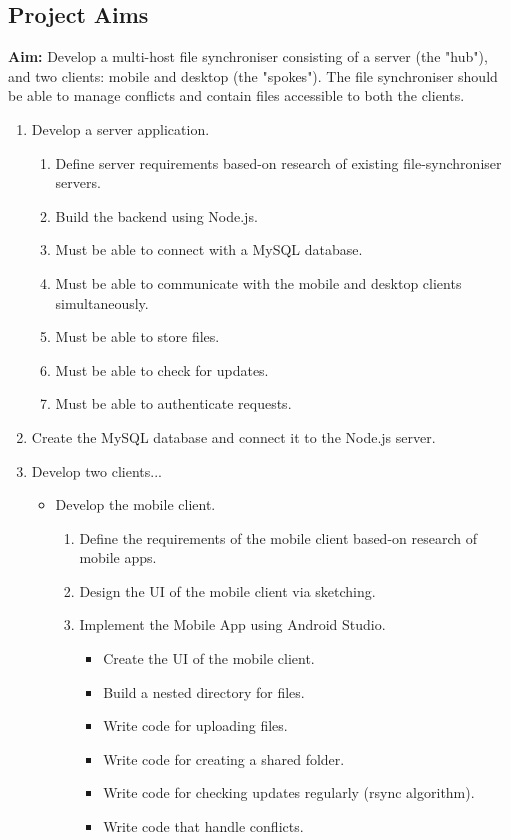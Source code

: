 \documentclass{article}
\begin{document}
	\subsection{Project Aims}
	\textbf{Aim: } Develop a multi-host file synchroniser consisting of a server (the "hub"), and two clients: mobile and desktop (the "spokes"). The file synchroniser should be able to manage conflicts and contain files accessible to both the clients.
	\begin{enumerate}
	\item Develop a server application.
		\begin{enumerate}
		\item Define server requirements based-on research of existing file-synchroniser servers.
		\item Build the backend using Node.js.
		\item Must be able to connect with a MySQL database.
		\item Must be able to communicate with the mobile and desktop clients simultaneously.
		\item Must be able to store files.
		\item Must be able to check for updates.
		\item Must be able to authenticate requests. 
		\end{enumerate}
	\item Create the MySQL database and connect it to the Node.js server.
	\item Develop two clients...
		\begin{itemize}
		\item Develop the mobile client.
			\begin{enumerate}
			\item Define the requirements of the mobile client based-on research of mobile apps.
			\item Design the UI of the mobile client via sketching.
			\item Implement the Mobile App using Android Studio.
				\begin{itemize}
				\item Create the UI of the mobile client.
				\item Build a nested directory for files.
				\item Write code for uploading files.
				\item Write code for creating a shared folder.
				\item Write code for checking updates regularly (rsync algorithm).
				\item Write code that handle conflicts.

\end{itemize}
\end{enumerate}
\end{itemize}
\end{enumerate}
\end{document}
